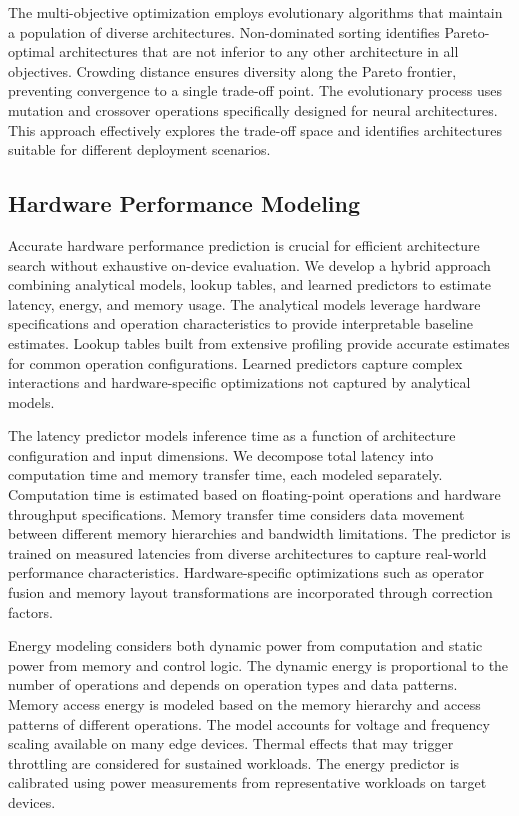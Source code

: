 \documentclass[journal]{IEEEtran}
\begin{document}
The multi-objective optimization employs evolutionary algorithms that maintain a population of diverse architectures. Non-dominated sorting identifies Pareto-optimal architectures that are not inferior to any other architecture in all objectives. Crowding distance ensures diversity along the Pareto frontier, preventing convergence to a single trade-off point. The evolutionary process uses mutation and crossover operations specifically designed for neural architectures. This approach effectively explores the trade-off space and identifies architectures suitable for different deployment scenarios.

\subsection{Hardware Performance Modeling}

Accurate hardware performance prediction is crucial for efficient architecture search without exhaustive on-device evaluation. We develop a hybrid approach combining analytical models, lookup tables, and learned predictors to estimate latency, energy, and memory usage. The analytical models leverage hardware specifications and operation characteristics to provide interpretable baseline estimates. Lookup tables built from extensive profiling provide accurate estimates for common operation configurations. Learned predictors capture complex interactions and hardware-specific optimizations not captured by analytical models.

The latency predictor models inference time as a function of architecture configuration and input dimensions. We decompose total latency into computation time and memory transfer time, each modeled separately. Computation time is estimated based on floating-point operations and hardware throughput specifications. Memory transfer time considers data movement between different memory hierarchies and bandwidth limitations. The predictor is trained on measured latencies from diverse architectures to capture real-world performance characteristics. Hardware-specific optimizations such as operator fusion and memory layout transformations are incorporated through correction factors.

Energy modeling considers both dynamic power from computation and static power from memory and control logic. The dynamic energy is proportional to the number of operations and depends on operation types and data patterns. Memory access energy is modeled based on the memory hierarchy and access patterns of different operations. The model accounts for voltage and frequency scaling available on many edge devices. Thermal effects that may trigger throttling are considered for sustained workloads. The energy predictor is calibrated using power measurements from representative workloads on target devices.
\end{document}
